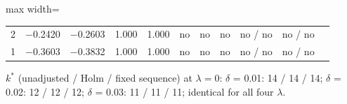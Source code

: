 \begin{table}[htbp]
\begin{adjustbox}{max width=\textwidth}
\begin{tabular}{rcccccccccc}
2 & $-$0.2420 & $-$0.2603 & 1.000 & 1.000 & no & no & no & no / no & no / no \\
1 & $-$0.3603 & $-$0.3832 & 1.000 & 1.000 & no & no & no & no / no & no / no \\
\bottomrule
\end{tabular}
\end{adjustbox}
\par\smallskip\parbox{0.95\linewidth}{\footnotesize $k^*$ (unadjusted / Holm / fixed sequence) at $\lambda = 0$: $\delta$ = 0.01: 14 / 14 / 14; $\delta$ = 0.02: 12 / 12 / 12; $\delta$ = 0.03: 11 / 11 / 11; identical for all four $\lambda$.}
\end{table}
